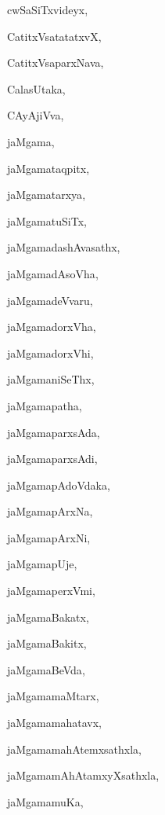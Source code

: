 \begin{multicols}{2}
{cwSaSiTxvideyx}, \pageref{cwSaSiTxvideyx}

{CatitxVsatatatxvX}, \pageref{CatitxVsatatatxvX}

{CatitxVsaparxNava}, \pageref{CatitxVsaparxNava}

{CalasUtaka}, \pageref{CalasUtaka}

{CAyAjiVva}, \pageref{CAyAjiVva}

{jaMgama}, \pageref{jaMgama}

{jaMgamataqpitx}, \pageref{jaMgamataqpitx}

{jaMgamatarxya}, \pageref{jaMgamatarxya}

{jaMgamatuSiTx}, \pageref{jaMgamatuSiTx}

{jaMgamadashAvasathx}, \pageref{jaMgamadashAvasathx}

{jaMgamadAsoVha}, \pageref{jaMgamadAsoVha}

{jaMgamadeVvaru}, \pageref{jaMgamadeVvaru}

{jaMgamadorxVha}, \pageref{jaMgamadorxVha}

{jaMgamadorxVhi}, \pageref{jaMgamadorxVhi}

{jaMgamaniSeThx}, \pageref{jaMgamaniSeThx}

{jaMgamapatha}, \pageref{jaMgamapatha}

{jaMgamaparxsAda}, \pageref{jaMgamaparxsAda}

{jaMgamaparxsAdi}, \pageref{jaMgamaparxsAdi}

{jaMgamapAdoVdaka}, \pageref{jaMgamapAdoVdaka}

{jaMgamapArxNa}, \pageref{jaMgamapArxNa}

{jaMgamapArxNi}, \pageref{jaMgamapArxNi}

{jaMgamapUje}, \pageref{jaMgamapUje}

{jaMgamaperxVmi}, \pageref{jaMgamaperxVmi}

{jaMgamaBakatx}, \pageref{jaMgamaBakatx}

{jaMgamaBakitx}, \pageref{jaMgamaBakitx}

{jaMgamaBeVda}, \pageref{jaMgamaBeVda}

{jaMgamamaMtarx}, \pageref{jaMgamamaMtarx}

{jaMgamamahatavx}, \pageref{jaMgamamahatavx}

{jaMgamamahAtemxsathxla}, \pageref{jaMgamamahAtemxsathxla}

{jaMgamamAhAtamxyXsathxla}, \pageref{jaMgamamAhAtamxyXsathxla}

{jaMgamamuKa}, \pageref{jaMgamamuKa}


\end{multicols}
